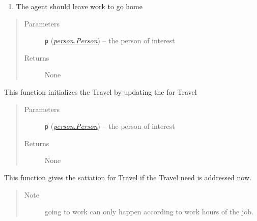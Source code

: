 \documentclass[letterpaper,10pt,english]{sphinxmanual}
\begin{document}
\begin{fulllineitems}
\begin{fulllineitems}
\begin{enumerate}
\item {} 
The agent should leave work to go home

\end{enumerate}
\begin{quote}\begin{description}
\item[{Parameters}] \leavevmode
\textbf{\texttt{p}} ({\hyperref[person:person.Person]{\emph{\emph{person.Person}}}}) -- the person of interest

\item[{Returns}] \leavevmode
None

\end{description}\end{quote}

\end{fulllineitems}


\begin{fulllineitems}
\label{travel:travel.Travel.initialize}
This function initializes the Travel by updating the {\hyperref[scheduler:scheduler.Scheduler]{\emph{}}} for Travel
\begin{quote}\begin{description}
\item[{Parameters}] \leavevmode
\textbf{\texttt{p}} ({\hyperref[person:person.Person]{\emph{\emph{person.Person}}}}) -- the person of interest

\item[{Returns}] \leavevmode
None

\end{description}\end{quote}

\end{fulllineitems}


\begin{fulllineitems}
\label{travel:travel.Travel.perceive}
This function gives the satiation for Travel if the Travel need is addressed now.
\begin{quote}\begin{description}
\item[{Note}] \leavevmode
going to work can only happen according to work hours of the job.


\end{description}
\end{quote}
\end{fulllineitems}
\end{fulllineitems}
\end{document}
